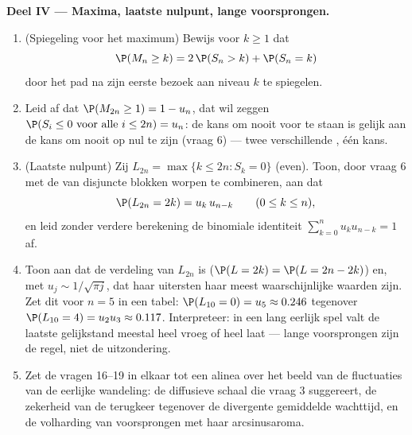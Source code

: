 \begin{problem}
\medskip
\noindent\textbf{Deel IV --- Maxima, laatste nulpunt, lange
voorsprongen.}
\begin{enumerate}[resume]
  \item (Spiegeling voor het maximum) Bewijs voor $k \geq 1$ dat
        \[
        \P(M_n \geq k) = 2\,\P(S_n > k) + \P(S_n = k)
        \]
        door het pad na zijn eerste bezoek aan niveau $k$ te
        spiegelen.
  \item Leid af dat $\P(M_{2n} \geq 1) = 1 - u_n$, dat wil zeggen
        $\P(S_i \leq 0 \text{ voor alle } i \leq 2n) = u_n$: de
        kans om nooit voor te staan is gelijk aan de kans om nooit
        op nul te zijn (vraag 6) --- twee verschillende
        , één kans.
  \item (Laatste nulpunt) Zij $L_{2n} = \max\{k \leq 2n : S_k =
        0\}$ (even). Toon, door vraag 6 met de 
        van disjuncte blokken worpen te combineren, aan dat
        \[
        \P(L_{2n} = 2k) = u_k\,u_{n-k}
        \qquad (0 \leq k \leq n),
        \]
        en leid zonder verdere berekening de binomiale identiteit
        $\sum_{k=0}^n u_ku_{n-k} = 1$ af.
  \item Toon aan dat de verdeling van $L_{2n}$  is
        ($\P(L = 2k) = \P(L = 2n - 2k)$) en, met $u_j \sim
        1/\sqrt{\pi j}$, dat haar uitersten haar meest
        waarschijnlijke waarden zijn. Zet dit voor $n = 5$ in een
        tabel: $\P(L_{10} = 0) = u_5 \approx 0.246$ tegenover
        $\P(L_{10} = 4) = u_2u_3 \approx 0.117$. Interpreteer: in
        een lang eerlijk spel valt de laatste gelijkstand meestal
        heel vroeg of heel laat --- lange voorsprongen zijn de
        regel, niet de uitzondering.
  \item Zet de vragen 16--19 in elkaar tot een alinea over het
        beeld van de fluctuaties van de eerlijke wandeling: de
        diffusieve schaal die vraag 3 suggereert, de zekerheid van
        de terugkeer tegenover de divergente gemiddelde wachttijd,
        en de volharding van voorsprongen met haar arcsinusaroma.
\end{enumerate}


\end{problem}
